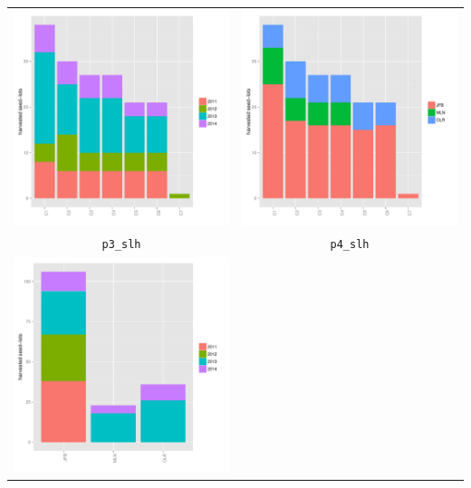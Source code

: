 \documentclass{article}\usepackage[]{graphicx}\usepackage[]{color}
\newenvironment{knitrout}{}{} %
\begin{document}
\begin{itemize}
\begin{center}
\begin{tabular}{cc}
\begin{knitrout}
{\centering \includegraphics[width=.4\textwidth]{figures/shinemas2R_unnamed-chunk-32-1} 

}



\end{knitrout}
&
\begin{knitrout}
\definecolor{shadecolor}{rgb}{0.969, 0.969, 0.969}\color{fgcolor}

{\centering \includegraphics[width=.4\textwidth]{figures/shinemas2R_unnamed-chunk-33-1} 

}



\end{knitrout}
\\
\texttt{p3\_slh} & \texttt{p4\_slh} \\
\begin{knitrout}
\definecolor{shadecolor}{rgb}{0.969, 0.969, 0.969}\color{fgcolor}

{\centering \includegraphics[width=.4\textwidth]{figures/shinemas2R_unnamed-chunk-34-1} 

}
\end{knitrout}
\end{tabular}
\end{center}
\end{itemize}
\end{document}
